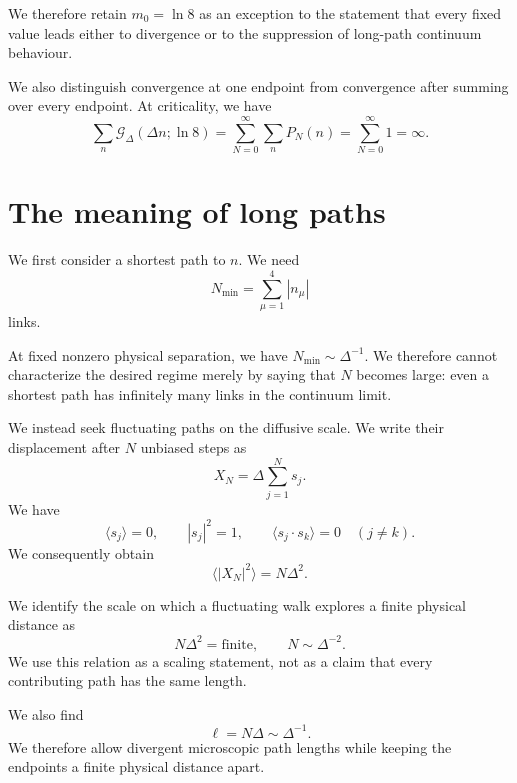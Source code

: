 \documentclass[11pt,a4paper]{article}
\numberwithin{equation}{section}
\begin{document}
We therefore retain $m_0=\ln8$ as an exception to
the statement that every fixed value leads either
to divergence or to the suppression of long-path
continuum behaviour.

We also distinguish convergence at one endpoint
from convergence after summing over every endpoint.
At criticality, we have
\begin{equation}
    \sum_n\mathcal G_\Delta(\Delta n;\ln8)
    =
    \sum_{N=0}^{\infty}\sum_nP_N(n)
    =
    \sum_{N=0}^{\infty}1
    =
    \infty.
\end{equation}

\section{The meaning of long paths}

We first consider a shortest path to $n$. We need
\begin{equation}
    N_{\min}=\sum_{\mu=1}^{4}|n_\mu|
\end{equation}
links.

At fixed nonzero physical separation, we have
$N_{\min}\sim\Delta^{-1}$. We therefore cannot
characterize the desired regime merely by saying
that $N$ becomes large: even a shortest path has
infinitely many links in the continuum limit.

We instead seek fluctuating paths on the diffusive
scale. We write their displacement after $N$
unbiased steps as
\begin{equation}
    X_N=\Delta\sum_{j=1}^{N}s_j.
\end{equation}
We have
\begin{equation}
    \langle s_j\rangle=0,
    \qquad
    |s_j|^2=1,
    \qquad
    \langle s_j\cdot s_k\rangle=0
    \quad(j\neq k).
\end{equation}
We consequently obtain
\begin{equation}
    \langle |X_N|^2\rangle=N\Delta^2.
\end{equation}

We identify the scale on which a fluctuating walk
explores a finite physical distance as
\begin{equation}
    \boxed{
    N\Delta^2=\text{finite},
    \qquad
    N\sim\Delta^{-2}.
    }
    \label{eq:diffusion}
\end{equation}
We use this relation as a scaling statement, not as
a claim that every contributing path has the same
length.

We also find
\begin{equation}
    \ell=N\Delta\sim\Delta^{-1}.
\end{equation}
We therefore allow divergent microscopic path
lengths while keeping the endpoints a finite
physical distance apart.
\end{document}
